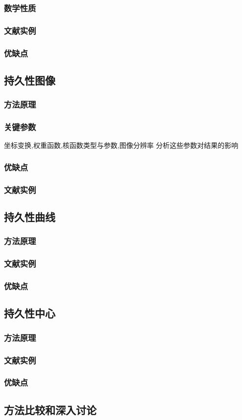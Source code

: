 \subsubsection{数学性质}
\subsubsection{文献实例}
\subsubsection{优缺点}

\subsection{持久性图像}
\subsubsection{方法原理}
\subsubsection{关键参数}
坐标变换,权重函数,核函数类型与参数,图像分辨率
分析这些参数对结果的影响
\subsubsection{优缺点}
\subsubsection{文献实例}

\subsection{持久性曲线}
\subsubsection{方法原理}
\subsubsection{文献实例}
\subsubsection{优缺点}

\subsection{持久性中心}
\subsubsection{方法原理}
\subsubsection{文献实例}
\subsubsection{优缺点}

\subsection{方法比较和深入讨论}
